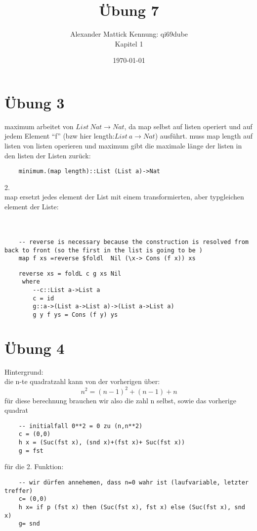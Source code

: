 \documentclass{article}
\author{
Alexander Mattick Kennung: qi69dube\\
Kapitel 1
}
\date{\today}
\title{Übung 7}
\newcommand{\Todo}[1]{\underline{\color{red}{#1}}}
\begin{document}
	\section{Übung 3}
	maximum arbeitet von $List\ Nat\to Nat$, da map selbst auf listen operiert und auf jedem Element ``f'' (bzw hier length:$List\ a\to Nat$) ausführt. muss map length auf listen von listen operieren und maximum gibt die maximale länge der listen in den listen der Listen zurück:\\
	\begin{verbatim}
	minimum.(map length)::List (List a)->Nat
	\end{verbatim}
	2.\\
	map ersetzt jedes element der List mit einem transformierten, aber typgleichen element der Liste:\\
	\Todo{benutzen die foldl mit argumentreihenfolge anders herum? MINDFUCK}\\
	\Todo{es gehört $Foldable\ t\Rightarrow (b \to a \to b) \to b \to t a \to b$}\\
	\Todo{UND DAS GLEICHE BEI DER ARGUMENTFUNKTION!!}
	\begin{verbatim}
	-- reverse is necessary because the construction is resolved from back to front (so the first in the list is going to be )
	map f xs =reverse $foldl  Nil (\x-> Cons (f x)) xs
	\end{verbatim}
	\begin{verbatim}
	reverse xs = foldL c g xs Nil
	 where
	 	--c::List a->List a
	 	c = id
	 	g::a->(List a->List a)->(List a->List a)
	 	g y f ys = Cons (f y) ys
	\end{verbatim}
	\section{Übung 4}
	Hintergrund:\\
	die n-te quadratzahl kann von der vorherigen über:\\
	\[n^2 = (n-1)^2+(n-1)+n\]
	für diese berechnung brauchen wir also die zahl n selbst, sowie das vorherige quadrat
	\begin{verbatim}
	-- initialfall 0**2 = 0 zu (n,n**2)
	c = (0,0)
	h x = (Suc(fst x), (snd x)+(fst x)+ Suc(fst x))
	g = fst
	\end{verbatim}
	für die 2. Funktion:
	\begin{verbatim}
	-- wir dürfen annehemen, dass n=0 wahr ist (laufvariable, letzter treffer)
	c= (0,0)
	h x= if p (fst x) then (Suc(fst x), fst x) else (Suc(fst x), snd x)
	g= snd
	\end{verbatim}
\end{document}
